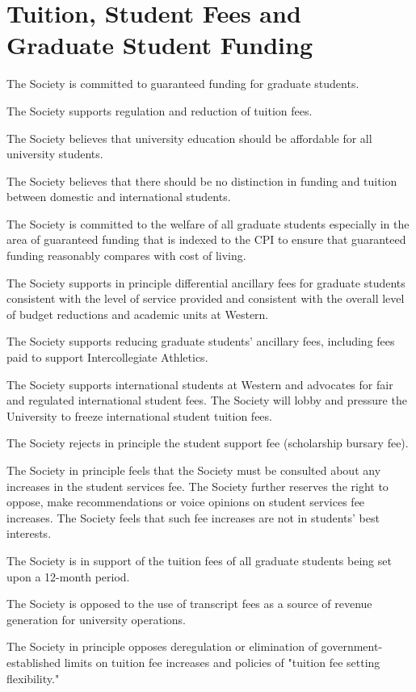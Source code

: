 \section{Tuition, Student Fees and Graduate Student Funding}
\begin{longenum}[ label*=\thesection.\arabic*., align=left]
\item  The Society is committed to guaranteed funding for graduate students.
\item The Society supports regulation and reduction of tuition fees.
\item The Society believes that university education should be affordable for all university students.
\item The Society believes that there should be no distinction in funding and tuition between domestic and international students.
\item The Society is committed to the welfare of all graduate students especially in the area of guaranteed funding that is indexed to the CPI to ensure that guaranteed funding reasonably compares with cost of living.
\item The Society supports in principle differential ancillary fees for graduate students consistent with the level of service provided and consistent with the overall level of budget reductions and academic units at Western.
\item The Society supports reducing graduate students’ ancillary fees, including fees paid to support Intercollegiate Athletics.
\item The Society supports international students at Western and advocates for fair and regulated international student fees. The Society will lobby and pressure the University to freeze international student tuition fees.
\item The Society rejects in principle the student support fee (scholarship bursary fee).
\item The Society in principle feels that the Society must be consulted about any increases in the student services fee. The Society further reserves the right to oppose, make recommendations or voice opinions on student services fee increases. The Society feels that such fee increases are not in students’ best interests.
\item The Society is in support of the tuition fees of all graduate students being set upon a 12-month period.
\item The Society is opposed to the use of transcript fees as a source of revenue generation for university operations.
\item The Society in principle opposes deregulation or elimination of government-established limits on tuition fee increases and policies of "tuition fee setting flexibility."
\end{longenum}	

